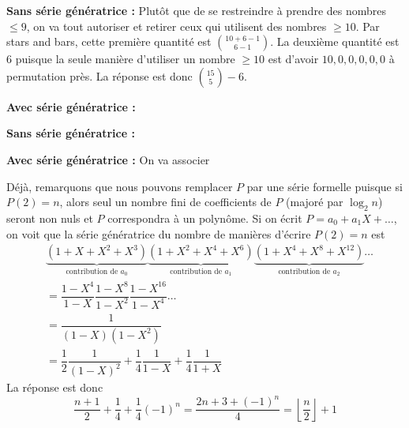 \begin{sol}
\textbf{Sans série génératrice :} Plutôt que de se restreindre à prendre des nombres $\le 9$, on va tout autoriser et retirer ceux qui utilisent des nombres $\ge 10$. Par stars and bars, cette première quantité est $\binom{10 + 6 - 1}{6 - 1}$. La deuxième quantité est $6$ puisque la seule manière d'utiliser un nombre $\ge 10$ est d'avoir $10, 0, 0, 0, 0, 0$ à permutation près. La réponse est donc $\binom{15}5 - 6$.

\textbf{Avec série génératrice :}
\end{sol}


\begin{sol}
\textbf{Sans série génératrice :}

\textbf{Avec série génératrice :} On va associer
\end{sol}


\begin{sol}
Déjà, remarquons que nous pouvons remplacer $P$ par une série formelle puisque si $P(2) = n$, alors seul un nombre fini de coefficients de $P$ (majoré par $\log_2 n$) seront non nuls et $P$ correspondra à un polynôme. Si on écrit $P = a_0 + a_1X + \dots$, on voit que la série génératrice du nombre de manières d'écrire $P(2) = n$ est
\begin{align*}
& \underbrace{(1 + X + X^2 + X^3)}_{\text{contribution de }a_0}\underbrace{(1 + X^2 + X^4 + X^6)}_{\text{contribution de }a_1}\underbrace{(1 + X^4 + X^8 + X^{12})}_{\text{contribution de }a_2}\dots \\
& = \dfrac{1 - X^4}{1 - X}\dfrac{1 - X^8}{1 - X^2}\dfrac{1 - X^{16}}{1 - X^4}\dots \\
& = \dfrac 1{(1 - X)(1 - X^2)} \\
& = \dfrac 1 2\dfrac 1{(1 - X)^2} + \dfrac 1 4\dfrac 1{1 - X} + \dfrac 1 4\dfrac 1{1 + X}
\end{align*}
La réponse est donc
$$\frac{n + 1}2 + \frac 1 4 + \frac 1 4 (-1)^n = \frac{2n + 3 + (-1)^n}4 = \left\lfloor\frac n 2\right\rfloor + 1$$
\end{sol}


